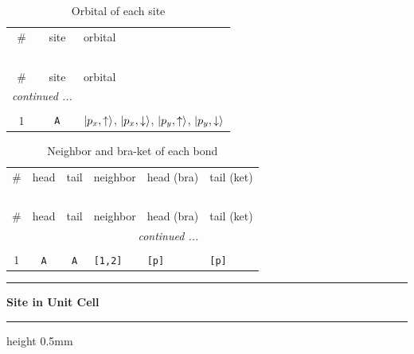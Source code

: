 \documentclass[fleqn,10pt,landscape]{jsarticle}
\begin{document}
\renewcommand{\arraystretch}{1.6}
\begin{longtable}[l]{ccl}
\captionsetup{justification=raggedright, singlelinecheck=off}
\caption{Orbital of each site}
 \\
 \hline \hline
\# & site & orbital \\ \hline \endfirsthead

\multicolumn{2}{l}{\tablename\ \thetable{}} \\
 \hline \hline
\# & site & orbital \\ \hline \endhead

 \hline \hline
\multicolumn{2}{r}{\footnotesize\it continued ...} \\ \endfoot

 \hline \hline
\multicolumn{2}{r}{} \\ \endlastfoot

1 & \texttt{A} & $\ket{p_{x},\uparrow}$, $\ket{p_{x},\downarrow}$, $\ket{p_{y},\uparrow}$, $\ket{p_{y},\downarrow}$ \\
\end{longtable}
\renewcommand{\arraystretch}{1.6}
\begin{longtable}[l]{ccclll}
\captionsetup{justification=raggedright, singlelinecheck=off}
\caption{Neighbor and bra-ket of each bond}
 \\
 \hline \hline
\# & head & tail & neighbor & head (bra) & tail (ket) \\ \hline \endfirsthead

\multicolumn{5}{l}{\tablename\ \thetable{}} \\
 \hline \hline
\# & head & tail & neighbor & head (bra) & tail (ket) \\ \hline \endhead

 \hline \hline
\multicolumn{5}{r}{\footnotesize\it continued ...} \\ \endfoot

 \hline \hline
\multicolumn{5}{r}{} \\ \endlastfoot

1 & \texttt{A} & \texttt{A} & \texttt{[1,2]} & \texttt{[p]} & \texttt{[p]} \\
\end{longtable}
\vspace{5mm}
\noindent \rule[0.5mm]{5mm}{0.5mm}\hspace{3mm}\textbf{Site in Unit Cell}\hspace{3mm}\leaders\hrule height 0.5mm\hfill\kern0pt
\vspace{3mm}
\end{document}
